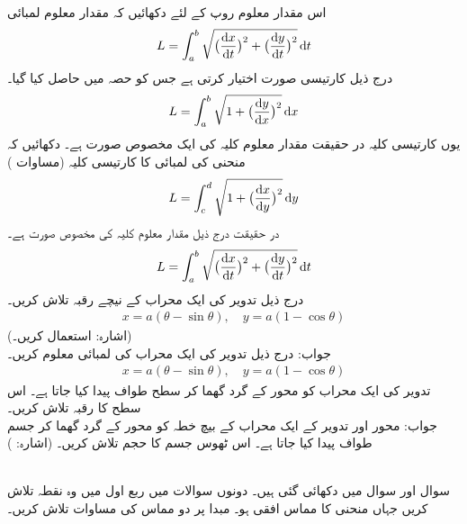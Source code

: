 اس مقدار معلوم روپ کے لئے دکھائیں کہ مقدار معلوم لمبائی
\begin{align*}
L=\int_a^b\sqrt{\big(\frac{\dif x}{\dif t}\big)^2+\big(\frac{\dif y}{\dif t}\big)^2}\dif t
\end{align*}
درج ذیل کارتیسی صورت اختیار کرتی ہے جس کو حصہ  میں حاصل کیا گیا۔
\begin{align*}
L=\int_a^b\sqrt{1+\big(\frac{\dif y}{\dif x}\big)^2}\dif x
\end{align*}
یوں کارتیسی کلیہ در حقیقت مقدار معلوم کلیہ کی ایک مخصوص صورت ہے۔
دکھائیں کہ منحنی  کی لمبائی کا کارتیسی کلیہ (مساوات )
\begin{align*}
L=\int_c^d\sqrt{1+\big(\frac{\dif x}{\dif y}\big)^2}\dif y
\end{align*}
در حقیقت درج ذیل مقدار  معلوم کلیہ کی مخصوص صورت ہے۔
\begin{align*}
L=\int_a^b\sqrt{\big(\frac{\dif x}{\dif t}\big)^2+\big(\frac{\dif y}{\dif t}\big)^2}\dif t
\end{align*}
درج ذیل تدویر کی ایک محراب کے نیچے رقبہ تلاش کریں۔
\begin{align*}
x=a(\theta-\sin\theta),\quad y=a(1-\cos\theta)
\end{align*} \quad
(اشارہ: استعمال کریں۔)\\
جواب:\quad
{}
درج ذیل تدویر کی ایک محراب کی لمبائی معلوم کریں۔
\begin{align*}
x=a(\theta-\sin\theta),\quad y=a(1-\cos\theta)
\end{align*}
تدویر  کی ایک محراب کو محور  کے گرد گھما کر سطح طواف پیدا کیا جاتا ہے۔ اس سطح کا رقبہ تلاش کریں۔\\
جواب:\quad
{}
محور  اور تدویر  کے ایک محراب کے بیچ خطہ کو محور  کے گرد گھما کر جسم طواف پیدا کیا جاتا ہے۔ اس ٹھوس جسم کا حجم تلاش کریں۔ (اشارہ: )

\\
سوال  اور سوال  میں  دکھائی گئی ہیں۔  دونوں سوالات میں ربع اول میں وہ نقطہ تلاش کریں جہاں منحنی کا مماس افقی ہو۔ مبدا پر دو مماس کی مساوات تلاش کریں۔

